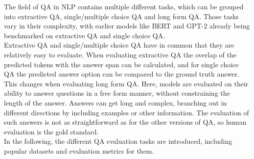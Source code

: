 The field of QA in NLP contains multiple different tasks, which can be grouped into extractive QA, single/multiple choice QA and long form QA.
Those tasks vary in their complexity, with earlier models like BERT and GPT-2 already being benchmarked on extractive QA and single choice QA.
\\
Extractive QA and single/multiple choice QA have in common that they are relatively easy to evaluate.
When evaluating extractive QA the overlap of the predicted tokens with the answer span can be calculated, and for single choice QA the predicted answer option can be compared to the ground truth answer.
\\
This changes when evaluating long form QA.
Here, models are evaluated on their ability to answer questions in a free form manner, without constraining the length of the answer.
Answers can get long and complex, branching out in different directions by including examples or other information.
The evaluation of such answers is not as straightforward as for the other versions of QA, so human evaluation is the gold standard.
\\
In the following, the different QA evaluation tasks are introduced, including popular datasets and evaluation metrics for them.

